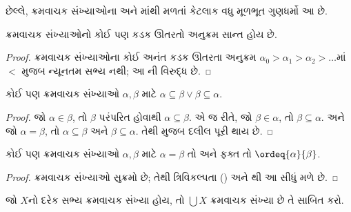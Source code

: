 \documentclass[../../../include/open-logic-section]{subfiles}
\begin{document}
છેલ્લે, ક્રમવાચક સંખ્યાઓના
 અને
માંથી મળતાં
કેટલાક વધુ મૂળભૂત ગુણધર્મો આ છે.

\begin{prop}
ક્રમવાચક સંખ્યાઓનો કોઈ પણ કડક
ઊતરતો અનુક્રમ સાન્ત હોય છે.
\end{prop}

\begin{proof}
ક્રમવાચક સંખ્યાઓના કોઈ અનંત કડક
ઊતરતા અનુક્રમ
$\alpha_0 > \alpha_1 > \alpha_2 > \ldots$માં
$<$ મુજબ ન્યૂનતમ સભ્ય નથી;
આ ની
વિરુદ્ધ છે.
\end{proof}

\begin{prop}
કોઈ પણ ક્રમવાચક સંખ્યાઓ
$\alpha, \beta$ માટે
$\alpha \subseteq \beta \lor \beta \subseteq \alpha$.
\end{prop}

\begin{proof}
જો $\alpha \in \beta$, તો $\beta$
પરંપરિત હોવાથી $\alpha \subseteq \beta$.
એ જ રીતે, જો $\beta \in \alpha$,
તો $\beta \subseteq
\alpha$. અને જો $\alpha = \beta$,
તો $\alpha \subseteq \beta$ અને
$\beta \subseteq \alpha$.
તેથી  મુજબ
દલીલ પૂરી થાય છે.
\end{proof}

\begin{prop}
કોઈ પણ ક્રમવાચક સંખ્યાઓ
$\alpha, \beta$ માટે
$\alpha = \beta$ તો અને ફક્ત તો
$\ordeq{\alpha}{\beta}$.
\end{prop}

\begin{proof}
ક્રમવાચક સંખ્યાઓ સુક્રમો છે;
તેથી ત્રિવિકલ્પતા
() અને
થી
આ સીધું મળે છે.
\end{proof}

\begin{prob}
જો $X$નો દરેક સભ્ય ક્રમવાચક
સંખ્યા હોય, તો $\bigcup X$
ક્રમવાચક સંખ્યા છે તે સાબિત કરો.
\end{prob}
\end{document}
